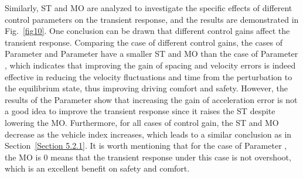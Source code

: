 \documentclass[a4paper]{cas-sc}
\begin{document}
Similarly, ST and MO are analyzed to investigate the specific effects of different control parameters on the transient response, and the results are demonstrated in Fig.~\ref{fig10}. One conclusion can be drawn that different control gains affect the transient response. Comparing the case of different control gains, the cases of Parameter \uppercase\expandafter{} and Parameter \uppercase\expandafter{} have a smaller ST and MO than the case of Parameter \uppercase\expandafter{}, which indicates that improving the gain of spacing and velocity errors is indeed effective in reducing the velocity fluctuations and time from the perturbation to the equilibrium state, thus improving driving comfort and safety. However, the results of the Parameter \uppercase\expandafter{} show that increasing the gain of acceleration error is not a good idea to improve the transient response since it raises the ST despite lowering the MO. Furthermore, for all cases of control gain, the ST and MO decrease as the vehicle index increases, which leads to a similar conclusion as in Section~\ref{Section 5.2.1}. It is worth mentioning that for the case of Parameter \uppercase\expandafter{}, the MO is 0 means that the transient response under this case is not overshoot, which is an excellent benefit on safety and comfort.



\end{document}
